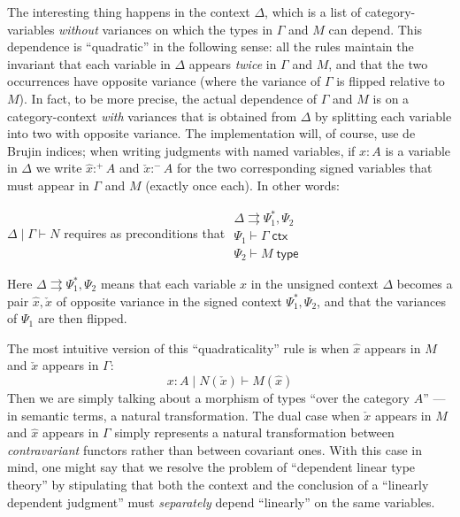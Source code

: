 \documentclass{amsart}
\let\types\vdash %
\def\cb{\mid} %
\def\p{^+} %
\def\m{^-}
\def\type{\;\mathsf{type}}
\def\ctx{\;\mathsf{ctx}}
\let\splits\rightrightarrows
\def\flip#1{#1^*} %
\begin{document}
The interesting thing happens in the context $\Delta$, which is a list of category-variables \emph{without} variances on which the types in $\Gamma$ and $M$ can depend.
This dependence is ``quadratic'' in the following sense: all the rules maintain the invariant that each variable in $\Delta$ appears \emph{twice} in $\Gamma$ and $M$, and that the two occurrences have opposite variance (where the variance of $\Gamma$ is flipped relative to $M$).
In fact, to be more precise, the actual dependence of $\Gamma$ and $M$ is on a category-context \emph{with} variances that is obtained from $\Delta$ by splitting each variable into two with opposite variance.
The implementation will, of course, use de Brujin indices; when writing judgments with named variables, if $x:A$ is a variable in $\Delta$ we write $\hat{x}:\p A$ and $\check{x}:\m A$ for the two corresponding signed variables that must appear in $\Gamma$ and $M$ (exactly once each).
In other words:
\begin{center}
  $\Delta\cb\Gamma\types N$ requires as preconditions that
  $\begin{array}{c}
    \Delta \splits \flip{\Psi_1},\Psi_2 \\
    \Psi_1 \types \Gamma \ctx\\
    \Psi_2 \types M \type
  \end{array}$
\end{center}
Here $\Delta\splits \flip{\Psi_1},\Psi_2$ means that each variable $x$ in the unsigned context $\Delta$ becomes a pair $\hat x, \check x$ of opposite variance in the signed context $\flip{\Psi_1},\Psi_2$, and that the variances of $\Psi_1$ are then flipped.

The most intuitive version of this ``quadraticality'' rule is when $\hat{x}$ appears in $M$ and $\check{x}$ appears in $\Gamma$:
\[ x:A \cb N(\check x) \types M(\hat x) \]
Then we are simply talking about a morphism of types ``over the category $A$'' --- in semantic terms, a natural transformation.
The dual case when $\check{x}$ appears in $M$ and $\hat{x}$ appears in $\Gamma$ simply represents a natural transformation between \emph{contravariant} functors rather than between covariant ones.
With this case in mind, one might say that we resolve the problem of ``dependent linear type theory'' by stipulating that both the context and the conclusion of a ``linearly dependent judgment'' must \emph{separately} depend ``linearly'' on the same variables.
\end{document}
